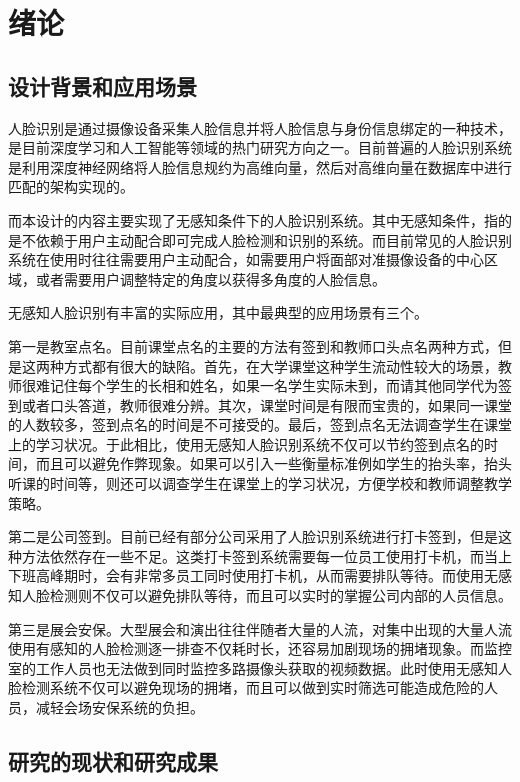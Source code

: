 \chapter{绪论}

\section{设计背景和应用场景}

人脸识别是通过摄像设备采集人脸信息并将人脸信息与身份信息绑定的一种技术，是目前深度学习和人工智能等领域的热门研究方向之一。目前普遍的人脸识别系统是利用深度神经网络将人脸信息规约为高维向量，然后对高维向量在数据库中进行匹配的架构实现的。

而本设计的内容主要实现了无感知条件下的人脸识别系统。其中无感知条件，指的是不依赖于用户主动配合即可完成人脸检测和识别的系统。而目前常见的人脸识别系统在使用时往往需要用户主动配合，如需要用户将面部对准摄像设备的中心区域，或者需要用户调整特定的角度以获得多角度的人脸信息。

无感知人脸识别有丰富的实际应用，其中最典型的应用场景有三个。

第一是教室点名。目前课堂点名的主要的方法有签到和教师口头点名两种方式，但是这两种方式都有很大的缺陷。首先，在大学课堂这种学生流动性较大的场景，教师很难记住每个学生的长相和姓名，如果一名学生实际未到，而请其他同学代为签到或者口头答道，教师很难分辨。其次，课堂时间是有限而宝贵的，如果同一课堂的人数较多，签到点名的时间是不可接受的。最后，签到点名无法调查学生在课堂上的学习状况。于此相比，使用无感知人脸识别系统不仅可以节约签到点名的时间，而且可以避免作弊现象。如果可以引入一些衡量标准例如学生的抬头率，抬头听课的时间等，则还可以调查学生在课堂上的学习状况，方便学校和教师调整教学策略。

第二是公司签到。目前已经有部分公司采用了人脸识别系统进行打卡签到，但是这种方法依然存在一些不足。这类打卡签到系统需要每一位员工使用打卡机，而当上下班高峰期时，会有非常多员工同时使用打卡机，从而需要排队等待。而使用无感知人脸检测则不仅可以避免排队等待，而且可以实时的掌握公司内部的人员信息。

第三是展会安保。大型展会和演出往往伴随者大量的人流，对集中出现的大量人流使用有感知的人脸检测逐一排查不仅耗时长，还容易加剧现场的拥堵现象。而监控室的工作人员也无法做到同时监控多路摄像头获取的视频数据。此时使用无感知人脸检测系统不仅可以避免现场的拥堵，而且可以做到实时筛选可能造成危险的人员，减轻会场安保系统的负担。

\section{研究的现状和研究成果}

